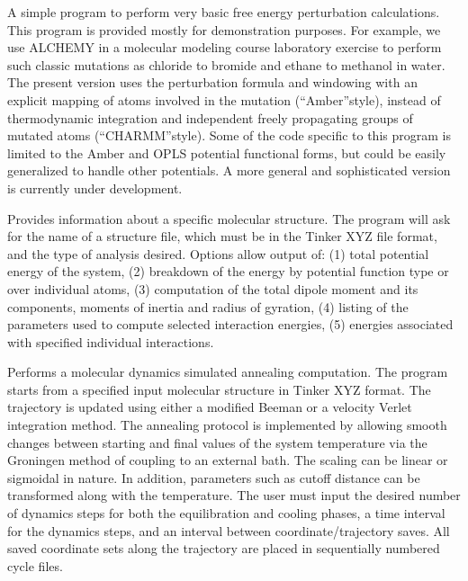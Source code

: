 \documentclass[letterpaper,11pt,english]{sphinxmanual}
\begin{document}

A simple program to perform very basic free energy perturbation calculations. This program is provided mostly for demonstration purposes.  For example, we use ALCHEMY in a molecular modeling course laboratory exercise to perform such classic mutations as chloride to bromide and ethane to methanol in water. The present version uses the perturbation formula and windowing with an explicit mapping of atoms involved in the mutation (“Amber”\sphinxhyphen{}style), instead of thermodynamic integration and independent freely propagating groups of mutated atoms (“CHARMM”\sphinxhyphen{}style). Some of the code specific to this program is limited to the Amber and OPLS potential functional forms, but could be easily generalized to handle other potentials. A more general and sophisticated version is currently under development.


Provides information about a specific molecular structure. The program will ask for the name of a structure file, which must be in the Tinker XYZ file format, and the type of analysis desired. Options allow output of:  (1) total potential energy of the system, (2) breakdown of the energy by potential function type or over individual atoms, (3) computation of the total dipole moment and its components, moments of inertia and radius of gyration, (4) listing of the parameters used to compute selected interaction energies, (5) energies associated with specified individual interactions.


Performs a molecular dynamics simulated annealing computation. The program starts from a specified input molecular structure in Tinker XYZ format. The trajectory is updated using either a modified Beeman or a velocity Verlet integration method. The annealing protocol is implemented by allowing smooth changes between starting and final values of the system temperature via the Groningen method of coupling to an external bath. The scaling can be linear or sigmoidal in nature. In addition, parameters such as cutoff distance can be transformed along with the temperature. The user must input the desired number of dynamics steps for both the equilibration and cooling phases, a time interval for the dynamics steps, and an interval between coordinate/trajectory saves. All saved coordinate sets along the trajectory are placed in sequentially numbered cycle files.
\end{document}

